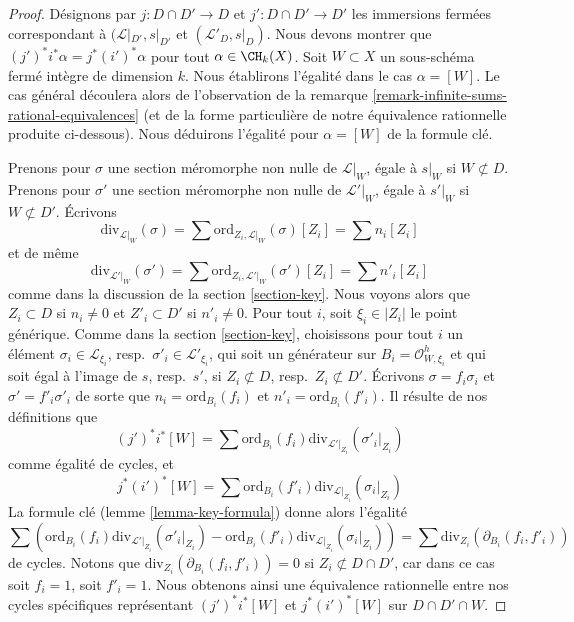\begin{proof}
Désignons par $j : D \cap D' \to D$ et $j' : D \cap D' \to D'$ les immersions fermées
correspondant à $(\mathcal{L}|_{D'}, s|_{D'}$ et $(\mathcal{L}'_D, s|_D)$.
Nous devons montrer que $(j')^*i^*\alpha = j^* (i')^*\alpha$ pour tout
$\alpha \in \CH_k(X)$. Soit $W \subset X$ un sous-schéma fermé intègre de
dimension $k$. Nous établirons l'égalité dans le cas $\alpha = [W]$. Le cas
général découlera alors de l'observation de la remarque
\ref{remark-infinite-sums-rational-equivalences} (et de la forme particulière de
notre équivalence rationnelle produite ci-dessous). Nous déduirons l'égalité
pour $\alpha = [W]$ de la formule clé.

\medskip\noindent
Prenons pour $\sigma$ une section méromorphe non nulle de
$\mathcal{L}|_W$, égale à $s|_W$ si $W \not
\subset D$. Prenons pour $\sigma'$ une section méromorphe non nulle de
$\mathcal{L}'|_W$, égale à $s'|_W$ si $W \not
\subset D'$. Écrivons
$$
\text{div}_{\mathcal{L}|_W}(\sigma) =
\sum \text{ord}_{Z_i, \mathcal{L}|_W}(\sigma)[Z_i] = \sum n_i[Z_i]
$$
et de même
$$
\text{div}_{\mathcal{L}'|_W}(\sigma') =
\sum \text{ord}_{Z_i, \mathcal{L}'|_W}(\sigma')[Z_i] = \sum n'_i[Z_i]
$$
comme dans la discussion de la section \ref{section-key}. Nous voyons alors
que $Z_i \subset D$ si $n_i \not = 0$ et $Z'_i \subset D'$ si $n'_i \not = 0$.
Pour tout $i$, soit $\xi_i \in |Z_i|$ le point générique. Comme dans la
section \ref{section-key}, choisissons pour tout $i$ un élément $\sigma_i \in
\mathcal{L}_{\xi_i}$, resp.\ $\sigma'_i \in \mathcal{L}'_{\xi_i}$, qui soit un générateur
sur $B_i = \mathcal{O}_{W, \xi_i}^h$ et qui soit égal à l'image de $s$, resp.\
$s'$, si $Z_i \not \subset D$, resp.\ $Z_i \not \subset D'$. Écrivons $\sigma =
f_i \sigma_i$ et $\sigma' = f'_i\sigma'_i$ de sorte que $n_i =
\text{ord}_{B_i}(f_i)$ et $n'_i = \text{ord}_{B_i}(f'_i)$. Il résulte de nos définitions que
$$
(j')^*i^*[W] =
\sum \text{ord}_{B_i}(f_i) \text{div}_{\mathcal{L}'|_{Z_i}}(\sigma'_i|_{Z_i})
$$
comme égalité de cycles, et
$$
j^*(i')^*[W] =
\sum \text{ord}_{B_i}(f'_i) \text{div}_{\mathcal{L}|_{Z_i}}(\sigma_i|_{Z_i})
$$
La formule clé (lemme \ref{lemma-key-formula}) donne alors l'égalité
$$
\sum \left(
\text{ord}_{B_i}(f_i) \text{div}_{\mathcal{L}'|_{Z_i}}(\sigma'_i|_{Z_i}) -
\text{ord}_{B_i}(f'_i) \text{div}_{\mathcal{L}|_{Z_i}}(\sigma_i|_{Z_i})
\right) =
\sum \text{div}_{Z_i}(\partial_{B_i}(f_i, f'_i))
$$
de cycles. Notons que $\text{div}_{Z_i}(\partial_{B_i}(f_i, f'_i)) = 0$ si
$Z_i \not \subset D \cap D'$, car dans ce cas soit $f_i = 1$, soit $f'_i = 1$. Nous
obtenons ainsi une équivalence rationnelle entre nos cycles spécifiques
représentant $(j')^*i^*[W]$ et $j^*(i')^*[W]$ sur $D \cap D' \cap W$.
\end{proof}










